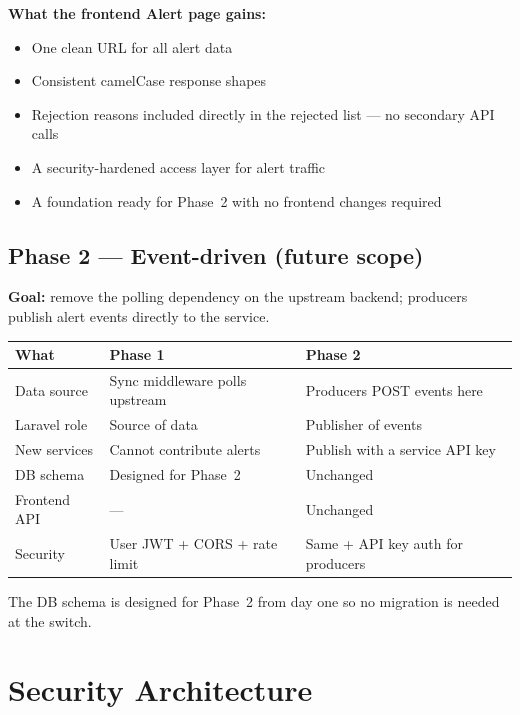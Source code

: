 \documentclass[11pt]{article}
\begin{document}
\textbf{What the frontend Alert page gains:}
\begin{itemize}
  \item One clean URL for all alert data
  \item Consistent camelCase response shapes
  \item Rejection reasons included directly in the rejected list --- no secondary API calls
  \item A security-hardened access layer for alert traffic
  \item A foundation ready for Phase~2 with no frontend changes required
\end{itemize}

\subsection{Phase 2 --- Event-driven (future scope)}

\textbf{Goal:} remove the polling dependency on the upstream backend; producers publish
alert events directly to the service.

\begin{table}[h]
\small
\begin{tabularx}{\textwidth}{l X X}
\toprule
\textbf{What} & \textbf{Phase 1} & \textbf{Phase 2} \\
\midrule
Data source & Sync middleware polls upstream & Producers POST events here \\
Laravel role & Source of data & Publisher of events \\
New services & Cannot contribute alerts & Publish with a service API key \\
DB schema & Designed for Phase~2 & Unchanged \\
Frontend API & --- & Unchanged \\
Security & User JWT + CORS + rate limit & Same + API key auth for producers \\
\bottomrule
\end{tabularx}
\end{table}

The DB schema is designed for Phase~2 from day one so no migration is needed at the switch.

\section{Security Architecture}
\label{sec:security}
\end{document}
